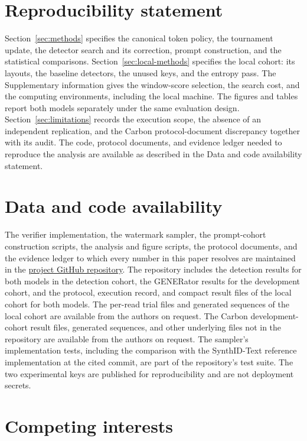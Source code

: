 \documentclass[10pt,twocolumn]{article}
\begin{document}
\section*{Reproducibility statement}

Section~\ref{sec:methods} specifies the canonical token policy, the tournament update, the
detector search and its correction, prompt construction, and the statistical comparisons.
Section~\ref{sec:local-methods} specifies the local cohort: its layouts, the baseline detectors, the
unused keys, and the entropy pass. The Supplementary information gives the window-score selection,
the search cost, and the computing environments, including the local machine. The figures and tables report both models separately under the same evaluation
design. Section~\ref{sec:limitations} records the execution scope, the absence of an independent
replication, and the Carbon protocol-document discrepancy together with its audit. The code,
protocol documents, and evidence ledger needed to reproduce the analysis are available as
described in the Data and code availability statement.

\section*{Data and code availability}

The verifier implementation, the watermark sampler, the prompt-cohort construction scripts, the
analysis and figure scripts, the protocol documents, and the evidence ledger to which every number
in this paper resolves are maintained in the
\href{https://github.com/Georgakopoulos-Soares-lab/genomic-sampling-watermarks}{project GitHub
repository}. The repository includes the detection results for both models in the detection
cohort, the GENERator results for the development cohort, and the protocol, execution record, and
compact result files of the local cohort for both models. The per-read trial files and generated
sequences of the local cohort are available from the authors on request. The Carbon development-cohort result
files, generated sequences, and other underlying files not in the repository are available from
the authors on request. The sampler's implementation tests, including the comparison with the
SynthID-Text reference implementation at the cited commit, are part of the repository's test
suite. The two experimental keys are published for reproducibility and are not deployment secrets.

\section*{Competing interests}
\end{document}
